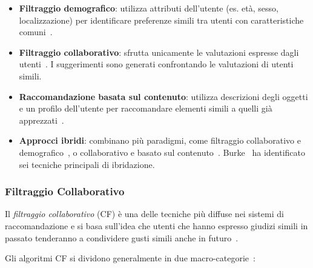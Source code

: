\begin{itemize}
    \item \textbf{Filtraggio demografico}: utilizza attributi dell’utente (es. età, sesso, localizzazione) per identificare preferenze simili tra utenti con caratteristiche comuni~\cite{bobadilla2013recommender, zhao2014we}.

    \item \textbf{Filtraggio collaborativo}: sfrutta unicamente le valutazioni espresse dagli utenti~\cite{adomavicius2005toward}. I suggerimenti sono generati confrontando le valutazioni di utenti simili.
    
    \item \textbf{Raccomandazione basata sul contenuto}: utilizza descrizioni degli oggetti e un profilo dell’utente per raccomandare elementi simili a quelli già apprezzati~\cite{ de2015semantics, lops2011content}.
    
    \item \textbf{Approcci ibridi}: combinano più paradigmi, come filtraggio collaborativo e demografico~\cite{vozalis2007using}, o collaborativo e basato sul contenuto~\cite{balabanovic1997fab}. Burke~\cite{burke2002hybrid} ha identificato sei tecniche principali di ibridazione.
\end{itemize}

\subsubsection{Filtraggio Collaborativo}

Il \emph{filtraggio collaborativo} (CF) è una delle tecniche più diffuse nei sistemi di raccomandazione e si basa sull’idea che utenti che hanno espresso giudizi simili in passato tenderanno a condividere gusti simili anche in futuro~\cite{adomavicius2005toward}. 

Gli algoritmi CF si dividono generalmente in due macro-categorie~\cite{LU20121}:

